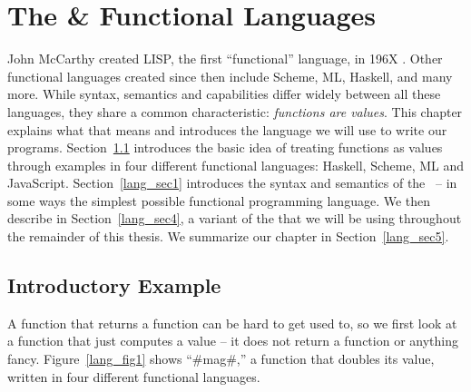 \documentclass[12pt]{report}
\begin{document}


\chapter{The \LamA \& Functional Languages}
\label{ref_chapter_languages}


John McCarthy created LISP, the first ``functional'' language, in 196X
\citep{McCarthyXX}. Other functional languages created since then
include Scheme, ML, Haskell, and many more. While syntax, semantics
and capabilities differ widely between all these languages, they share
a common characteristic: \emph{functions are values}.  This chapter
explains what that means and introduces the language we will use to
write our programs. Section~\ref{lang_sec2} introduces the basic idea
of treating functions as values through examples in four different
functional languages: Haskell, Scheme, ML and
JavaScript. Section~\ref{lang_sec1} introduces the syntax and
semantics of the \lamA\ -- in some ways the simplest possible
functional programming language. We then describe \lamC in
Section~\ref{lang_sec4}, a variant of the \lamA that we will be using
throughout the remainder of this thesis. We summarize our chapter in
Section~\ref{lang_sec5}.

\section{Introductory Example}
\label{lang_sec2}
A function that returns a function can be hard to get used to, so we
first look at a function that just computes a value -- it does not
return a function or anything fancy.  Figure~\ref{lang_fig1} shows
``#mag#,'' a function that doubles its value, written in four
different functional languages.
\end{document}
